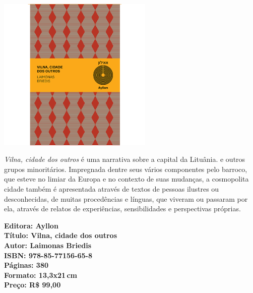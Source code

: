 \pagestyle{ayllon}
\label{ayllon}


\pagebreak
\begin{center}
\hspace*{-3.6cm}
\hspace*{3.1cm}\includegraphics[width=74mm]{./CAPAS/AYLLON_VILNA.jpg}
\end{center}
\hspace*{-7cm}\hrulefill\hspace*{-7cm}
\medskip

\noindent{}\textit{Vilna, cidade dos outros} é uma narrativa sobre a capital da Lituânia.  e outros grupos minoritários. Impregnada dentre seus vários componentes pelo barroco, que esteve no limiar da Europa e no contexto de suas mudanças, a cosmopolita cidade também é apresentada através de textos de pessoas ilustres ou desconhecidas, de muitas procedências e línguas, que viveram ou passaram por ela, através de relatos de experiências, sensibilidades e perspectivas próprias.

\vfill
\hspace*{-.4cm}\begin{minipage}[c]{1\linewidth}
\small\textbf{
\hspace*{-.1cm}Editora: Ayllon\\
Título: Vilna, cidade dos outros\\
Autor: Laimonas Briedis\\ 
ISBN: 978-85-77156-65-8\\
Páginas: 380\\
Formato: 13,3x21\,cm\\
Preço: R\$ 99,00
}
\end{minipage}
\pagebreak

